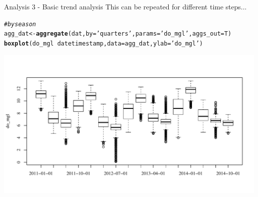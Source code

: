 \documentclass[xcolor=svgnames]{beamer}\usepackage[]{graphicx}\usepackage[]{color}
\makeatletter
\newcommand{\hlstr}[1]{\textcolor[rgb]{0.192,0.494,0.8}{#1}}%
\newcommand{\hlcom}[1]{\textcolor[rgb]{0.678,0.584,0.686}{\textit{#1}}}%
\newcommand{\hlopt}[1]{\textcolor[rgb]{0,0,0}{#1}}%
\newcommand{\hlstd}[1]{\textcolor[rgb]{0.345,0.345,0.345}{#1}}%
\newcommand{\hlkwb}[1]{\textcolor[rgb]{0.69,0.353,0.396}{#1}}%
\newcommand{\hlkwc}[1]{\textcolor[rgb]{0.333,0.667,0.333}{#1}}%
\newcommand{\hlkwd}[1]{\textcolor[rgb]{0.737,0.353,0.396}{\textbf{#1}}}%
\newenvironment{kframe}{%
 \def\at@end@of@kframe{}%
 \ifinner\ifhmode%
  \def\at@end@of@kframe{\end{minipage}}%
  \begin{minipage}{\columnwidth}%
 \fi\fi%
 \def\FrameCommand##1{\hskip\@totalleftmargin \hskip-\fboxsep
 \colorbox{shadecolor}{##1}\hskip-\fboxsep
     \hskip-\linewidth \hskip-\@totalleftmargin \hskip\columnwidth}%
 \MakeFramed {\advance\hsize-\width
   \@totalleftmargin\z@ \linewidth\hsize
   \@setminipage}}%
 {\par\unskip\endMakeFramed%
 \at@end@of@kframe}
\newenvironment{knitrout}{}{} %
\makeatother
\begin{document}
\begin{frame}[containsverbatim]{Analysis 3 - Basic trend analysis}
This can be repeated for different time steps...
\begin{knitrout}\scriptsize
{}\color{fgcolor}\begin{kframe}
\begin{alltt}
\hlcom{# by season}
\hlstd{agg_dat} \hlkwb{<-} \hlkwd{aggregate}\hlstd{(dat,} \hlkwc{by} \hlstd{=} \hlstr{'quarters'}\hlstd{,} \hlkwc{params} \hlstd{=} \hlstr{'do_mgl'}\hlstd{,} \hlkwc{aggs_out} \hlstd{= T)}
\hlkwd{boxplot}\hlstd{(do_mgl} \hlopt{~} \hlstd{datetimestamp,} \hlkwc{data} \hlstd{= agg_dat,} \hlkwc{ylab} \hlstd{=} \hlstr{'do_mgl'}\hlstd{)}
\end{alltt}
\end{kframe}

{\centering \includegraphics[width=\textwidth]{figure/unnamed-chunk-22} 

}



\end{knitrout}
\end{frame}
\end{document}
